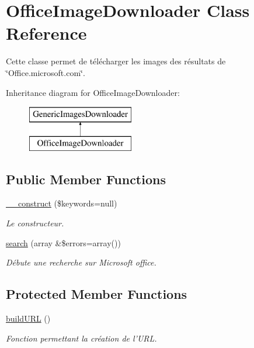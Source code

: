 \hypertarget{class_office_image_downloader}{\section{Office\-Image\-Downloader Class Reference}
\label{class_office_image_downloader}
}


Cette classe permet de télécharger les images des résultats de \char`\"{}\-Office.\-microsoft.\-com\char`\"{}.  


Inheritance diagram for Office\-Image\-Downloader\-:\begin{figure}[H]
\begin{center}
\leavevmode
\includegraphics[height=2.000000cm]{class_office_image_downloader}
\end{center}
\end{figure}
\subsection*{Public Member Functions}
\begin{DoxyCompactItemize}
\item 
\hyperlink{class_office_image_downloader_af7a671cb2bc664328fb5224f0da6ef60}{\-\_\-\-\_\-construct} (\$keywords=null)
\begin{DoxyCompactList}\small\item\em Le constructeur. \end{DoxyCompactList}\item 
\hyperlink{class_office_image_downloader_aeaf78020730e78dd35d16d14b527b44c}{search} (array \&\$errors=array())
\begin{DoxyCompactList}\small\item\em Débute une recherche sur Microsoft office. \end{DoxyCompactList}\end{DoxyCompactItemize}
\subsection*{Protected Member Functions}
\begin{DoxyCompactItemize}
\item 
\hypertarget{class_office_image_downloader_a3a3e8ed69a7a72d69950426ec9424a64}{\hyperlink{class_office_image_downloader_a3a3e8ed69a7a72d69950426ec9424a64}{build\-U\-R\-L} ()}\label{class_office_image_downloader_a3a3e8ed69a7a72d69950426ec9424a64}

\begin{DoxyCompactList}\small\item\em Fonction permettant la création de l'U\-R\-L. \end{DoxyCompactList}\end{DoxyCompactItemize}
